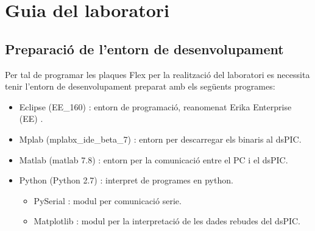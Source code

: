 
\chapter{Guia del laboratori}\label{cap:lab_gui}


\ifpdf
    \graphicspath{{5_laboratory_guide/figures/PNG/}{5_laboratory_guide/figures/PDF/}{5_laboratory_guide/figures/}}
\else
    \graphicspath{{5_laboratory_guide/figures/EPS/}{5_laboratory_guide/figures/}}
\fi




\section{Preparació de l'entorn de desenvolupament}
Per tal de programar les plaques Flex per la realització del laboratori 
es necessita tenir l'entorn de desenvolupament preparat amb els següents 
programes:

\begin{itemize}
  	\item Eclipse (EE\_160) : entorn de programació, reanomenat Erika Enterprise (EE) \RTDruid.
	\item Mplab (mplabx\_ide\_beta\_7) : entorn per descarregar els binaris al dsPIC.
	\item Matlab (matlab 7.8) : entorn per la comunicació entre el PC i el dsPIC.
	\item Python (Python 2.7) : interpret de programes en python.
	\begin{itemize}
		\item PySerial : modul per comunicació serie.
		\item Matplotlib : modul per la interpretació de les dades rebudes del dsPIC.
	\end{itemize}
\end{itemize}


